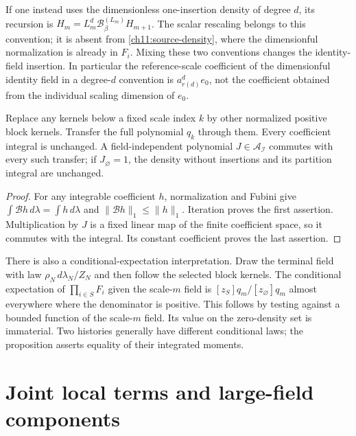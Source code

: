 If one instead uses the dimensionless one-insertion density of degree
$d$, its recursion is $H_m=L_m^d\mathcal B^{(L_m)}_\beta H_{m+1}$.
The scalar rescaling belongs to this convention; it is absent from
\eqref{ch11:source-density}, where the dimensionful normalization is
already in $F_i$. Mixing these two conventions changes the identity-field
insertion. In particular the reference-scale coefficient of the dimensionful
identity field in a degree-$d$ convention is $a_{r(d)}^d e_0$, not the coefficient
obtained from the individual scaling dimension of $e_0$.

\begin{proposition}
\label{ch11:mass}
Replace any kernels below a fixed scale index $k$ by other normalized positive
block kernels. Transfer the full polynomial $q_k$ through them.
Every coefficient integral is unchanged. A field-independent polynomial
$J\in\mathcal A_{\mathcal I}$ commutes with every such transfer; if
$J_\varnothing=1$, the density without insertions and its partition integral
are unchanged.
\end{proposition}
\begin{proof}
For any integrable coefficient $h$, normalization and Fubini give
$\int\mathcal B h\,d\lambda=\int h\,d\lambda$ and
$\|\mathcal B h\|_1\le\|h\|_1$.
Iteration proves the first assertion. Multiplication by $J$ is a fixed
linear map of the finite coefficient space, so it commutes with the
integral. Its constant coefficient proves the last assertion.
\end{proof}

There is also a conditional-expectation interpretation. Draw the terminal
field with law $\rho_N\,d\lambda_N/Z_N$ and then follow the selected
block kernels. The conditional expectation of $\prod_{i\in S}F_i$
given the scale-$m$ field is
$[z_S]q_m/[z_\varnothing]q_m$ almost everywhere where the denominator
is positive. This follows by testing against a bounded function of the
scale-$m$ field. Its value on the zero-density set is immaterial.
Two histories generally have different conditional laws; the proposition
asserts equality of their integrated moments.

\section{Joint local terms and large-field components}

